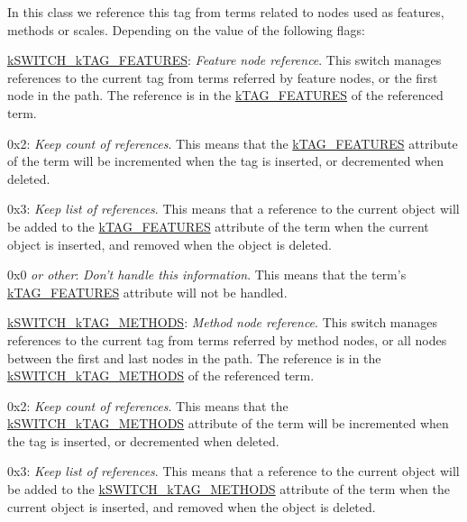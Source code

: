 In this class we reference this tag from terms related to nodes used as features, methods or scales. Depending on the value of the following flags\-:


\begin{DoxyItemize}
\item {\ttfamily \hyperlink{}{k\-S\-W\-I\-T\-C\-H\-\_\-k\-T\-A\-G\-\_\-\-F\-E\-A\-T\-U\-R\-E\-S}}\-: {\itshape Feature node reference}. This switch manages references to the current tag from terms referred by feature nodes, or the first node in the path. The reference is in the \hyperlink{}{k\-T\-A\-G\-\_\-\-F\-E\-A\-T\-U\-R\-E\-S} of the referenced term. 
\begin{DoxyItemize}
\item {\ttfamily 0x2}\-: {\itshape Keep count of references}. This means that the \hyperlink{}{k\-T\-A\-G\-\_\-\-F\-E\-A\-T\-U\-R\-E\-S} attribute of the term will be incremented when the tag is inserted, or decremented when deleted. 
\item {\ttfamily 0x3}\-: {\itshape Keep list of references}. This means that a reference to the current object will be added to the \hyperlink{}{k\-T\-A\-G\-\_\-\-F\-E\-A\-T\-U\-R\-E\-S} attribute of the term when the current object is inserted, and removed when the object is deleted. 
\item {\ttfamily 0x0} {\itshape or other}\-: {\itshape Don't handle this information}. This means that the term's \hyperlink{}{k\-T\-A\-G\-\_\-\-F\-E\-A\-T\-U\-R\-E\-S} attribute will not be handled. 
\end{DoxyItemize}
\item {\ttfamily \hyperlink{}{k\-S\-W\-I\-T\-C\-H\-\_\-k\-T\-A\-G\-\_\-\-M\-E\-T\-H\-O\-D\-S}}\-: {\itshape Method node reference}. This switch manages references to the current tag from terms referred by method nodes, or all nodes between the first and last nodes in the path. The reference is in the \hyperlink{}{k\-S\-W\-I\-T\-C\-H\-\_\-k\-T\-A\-G\-\_\-\-M\-E\-T\-H\-O\-D\-S} of the referenced term. 
\begin{DoxyItemize}
\item {\ttfamily 0x2}\-: {\itshape Keep count of references}. This means that the \hyperlink{}{k\-S\-W\-I\-T\-C\-H\-\_\-k\-T\-A\-G\-\_\-\-M\-E\-T\-H\-O\-D\-S} attribute of the term will be incremented when the tag is inserted, or decremented when deleted. 
\item {\ttfamily 0x3}\-: {\itshape Keep list of references}. This means that a reference to the current object will be added to the \hyperlink{}{k\-S\-W\-I\-T\-C\-H\-\_\-k\-T\-A\-G\-\_\-\-M\-E\-T\-H\-O\-D\-S} attribute of the term when the current object is inserted, and removed when the object is deleted. 

\end{DoxyItemize}
\end{DoxyItemize}
